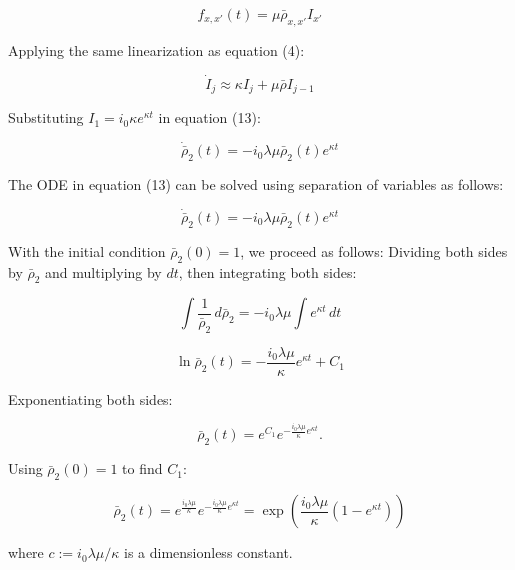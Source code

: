 \documentclass{article}
\begin{document}
\begin{equation}
f_{x,x'}(t) = \mu \bar \rho_{x,x'} I_{x'}
\end{equation}

Applying the same linearization as equation (4):

\begin{equation}
\dot I_j \approx \kappa I_j + \mu \bar \rho I_{j-1} 
\end{equation}

Substituting $I_1 = i_0 \kappa e^{\kappa t}$ in equation (13):

\begin{equation}
\dot{\bar{\rho}}_2(t) = - i_{0} \lambda \mu \bar \rho_{2}(t) e^{\kappa t}
\end{equation}

The ODE in equation (13) can be solved using separation of variables as follows:

\begin{equation}
\dot{\bar{\rho}}_2(t) = - i_{0} \lambda \mu \bar \rho_{2}(t) e^{\kappa t}
\end{equation}

With the initial condition $\bar \rho_{2}(0) = 1$, we proceed as follows:
Dividing both sides by $\bar \rho_{2}$ and multiplying by $dt$, then integrating both sides:

\begin{equation}
\int \frac{1}{\bar \rho_{2}} \, d\bar \rho_{2} = - i_{0} \lambda \mu \int e^{\kappa t} \, dt
\end{equation}

\begin{equation}
\ln \bar \rho_{2}(t) = - \frac{i_{0} \lambda \mu}{\kappa} e^{\kappa t} + C_1
\end{equation}

Exponentiating both sides:

\begin{equation}
\bar \rho_{2}(t) = e^{C_1} e^{-\frac{i_{0} \lambda \mu}{\kappa} e^{\kappa t}}.
\end{equation}

Using $\bar \rho_{2}(0) = 1$ to find $C_1$:

\begin{equation}
\bar \rho_{2}(t) = e^{\frac{i_{0} \lambda \mu}{\kappa}} e^{-\frac{i_{0} \lambda \mu}{\kappa} e^{\kappa t}}
 = \exp\left(\frac{i_{0} \lambda \mu}{\kappa} \left( 1 - e^{\kappa t} \right)\right) 
\end{equation}

where $c := i_{0} \lambda \mu / \kappa$ is a dimensionless constant.
\end{document}
